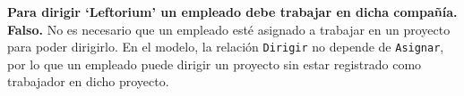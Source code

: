 \textbf{Para dirigir ‘Leftorium’ un empleado debe trabajar en dicha compañía.}\vspace{.3cm}
\textbf{Falso.} No es necesario que un empleado esté asignado a trabajar en un proyecto para poder dirigirlo. En el modelo, la relación \texttt{Dirigir} no depende de \texttt{Asignar}, por lo que un empleado puede dirigir un proyecto sin estar registrado como trabajador en dicho proyecto.

